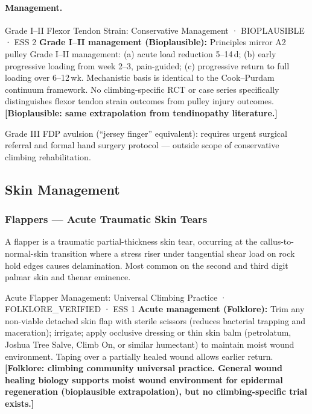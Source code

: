 \paragraph{Management.}\leavevmode

\begin{bioplausbox}{Grade I--II Flexor Tendon Strain: Conservative Management · BIOPLAUSIBLE · ESS 2}
\textbf{Grade I--II management (Bioplausible):} Principles mirror A2 pulley Grade I--II management: (a) acute load reduction 5--14\,d; (b) early progressive loading from week 2--3, pain-guided; (c) progressive return to full loading over 6--12\,wk. Mechanistic basis is identical to the Cook--Purdam continuum framework. No climbing-specific RCT or case series specifically distinguishes flexor tendon strain outcomes from pulley injury outcomes. \textbf{[Bioplausible: same extrapolation from tendinopathy literature.]}
\end{bioplausbox}

Grade III FDP avulsion (``jersey finger'' equivalent): requires urgent surgical referral and formal hand surgery protocol --- outside scope of conservative climbing rehabilitation.

\subsection{Skin Management}
\label{subsec:skin}

\subsubsection{Flappers --- Acute Traumatic Skin Tears}

A flapper is a traumatic partial-thickness skin tear, occurring at the callus-to-normal-skin transition where a stress riser under tangential shear load on rock hold edges causes delamination. Most common on the second and third digit palmar skin and thenar eminence.

\begin{folklorebox}{Acute Flapper Management: Universal Climbing Practice · FOLKLORE\_VERIFIED · ESS 1}
\textbf{Acute management (Folklore):} Trim any non-viable detached skin flap with sterile scissors (reduces bacterial trapping and maceration); irrigate; apply occlusive dressing or thin skin balm (petrolatum, Joshua Tree Salve, Climb On, or similar humectant) to maintain moist wound environment. Taping over a partially healed wound allows earlier return. \textbf{[Folklore: climbing community universal practice. General wound healing biology supports moist wound environment for epidermal regeneration (bioplausible extrapolation), but no climbing-specific trial exists.]}
\end{folklorebox}

